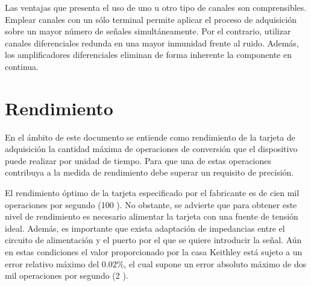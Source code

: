Las ventajas que presenta el uso de uno u otro tipo de canales son
comprensibles. Emplear canales con un sólo terminal permite aplicar el
proceso de adquisición sobre un mayor número de señales simultáneamente.
Por el contrario, utilizar canales diferenciales redunda en una mayor
inmunidad frente al ruido. Además, los amplificadores diferenciales
eliminan de forma inherente la componente en continua.


\section{Rendimiento}\label{sec:throughput}

En el ámbito de este documento se entiende como rendimiento de la tarjeta
de adquisición la cantidad máxima de operaciones de conversión que el
dispositivo puede realizar por unidad de tiempo. Para que una de estas
operaciones contribuya a la medida de rendimiento debe superar un requisito
de precisión.

El rendimiento óptimo de la tarjeta \kpci{} especificado por el fabricante
es de cien mil operaciones por segundo (100 \kms{}). No obstante, se
advierte que para obtener este nivel de rendimiento es necesario alimentar
la tarjeta con una fuente de tensión ideal. Además, es importante que
exista adaptación de impedancias entre el circuito de alimentación y el
puerto por el que se quiere introducir la señal. Aún en estas condiciones
el valor proporcionado por la casa Keithley está sujeto a un error relativo
máximo del $0.02\%$, el cual supone un error absoluto máximo de dos mil
operaciones por segundo (2 \kms{}).

